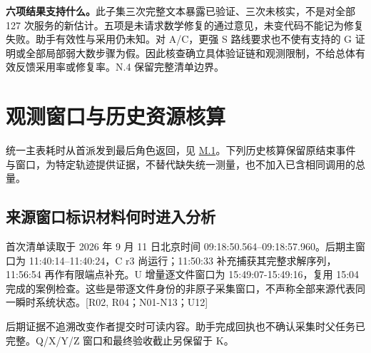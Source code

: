 \textbf{六项结果支持什么。}此子集三次完整文本暴露已验证、三次未核实，不是对全部 127 次服务的新估计。五项是未请求数学修复的通过意见，未变代码不能记为修复失败。助手有效性与采用仍未知。对 A/C，更强 S 路线要求也不使有支持的 G 证明或全部局部弱大数步骤为假。因此核查确立具体验证链和观测限制，不给总体有效反馈采用率或修复率。N.4 保留完整清单边界。

\section[观测窗口与历史资源核算]{\texorpdfstring{\protect\hypertarget{appendix-h}{}观测窗口与历史资源核算}{观测窗口与历史资源核算}}
统一主表耗时从首派发到最后角色返回，见 \hyperlink{m1}{M.1}。下列历史核算保留原结束事件与窗口，为特定轨迹提供证据，不替代缺失统一测量，也不加入已含相同调用的总量。

\subsection[来源窗口标识材料何时进入分析]{\texorpdfstring{\protect\hypertarget{h1}{}来源窗口标识材料何时进入分析}{来源窗口标识材料何时进入分析}}
首次清单读取于 2026 年 9 月 11 日北京时间 09:18:50.564–09:18:57.960。后期主窗口为 11:40:14–11:40:24，C r3 尚运行；11:50:33 补充捕获其完整求解序列，11:56:54 再作有限端点补充。U 增量逐文件窗口为 15:49:07-15:49:16，复用 15:04 完成的案例检查。这些是带逐文件身份的非原子采集窗口，不声称全部来源代表同一瞬时系统状态。[R02, R04；N01-N13；U12]

后期证据不追溯改变作者提交时可读内容。助手完成回执也不确认采集时父任务已完整。Q/X/Y/Z 窗口和最终验收截止另保留于 K。

